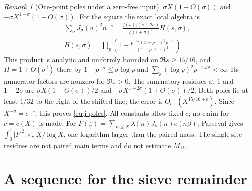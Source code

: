 \documentclass[11pt]{article}
\theoremstyle{definition}
\theoremstyle{remark}
\newtheorem{remark}[theorem]{Remark}
\numberwithin{equation}{section}
\begin{document}
\begin{remark}[One-point poles under a zero-free input]
$\sigma X(1+O(\sigma))$ and $-\sigma X^{1-\sigma}(1+O(\sigma))$.
For the square the exact local algebra is
\begin{equation}\label{eq:j-square-series}
\begin{gathered}
 \sum_nJ_\sigma(n)^2n^{-s}=\frac{\zeta(s)\zeta(s+2\sigma)}{\zeta(s+\sigma)^2}H(s,\sigma),\\
 H(s,\sigma)=\prod_p\left(1-
 \frac{p^{-2\sigma}(1-p^{-\sigma})^2p^{-2s}}{(1-p^{-s-\sigma})^2}\right).
\end{gathered}
\end{equation}
This product is analytic and uniformly bounded on $\Re s\ge15/16$, and $H=1+O(\sigma^2)$ there by
$1-p^{-\sigma}\le\sigma\log p$ and $\sum_p(\log p)^2p^{-15/8}<\infty$.
Its numerator factors are nonzero for $\Re s>0$. The summatory residues at $1$ and $1-2\sigma$ are
$\sigma X(1+O(\sigma))/2$ and $-\sigma X^{1-2\sigma}(1+O(\sigma))/2$.
Both poles lie at least $1/32$ to the right of the shifted line; the error is
$O_{c,\epsilon}(X^{15/16+\epsilon})$. Since $X^{-\sigma}=e^{-c}$, this proves \eqref{eq:j-poles}.
All constants allow fixed $c$; no claim for $c=c(X)$ is made.
For $F(\beta)=\sum_{n\le X}\lambda(n)J_\sigma(n)e(n\beta)$, Parseval gives
$\int_0^1|F|^2\asymp_cX/\log X$, one logarithm larger than the paired mass.
The single-site residues are not paired main terms and do not estimate $M_{12}$.
\end{remark}

\section{A sequence for the sieve remainder}\label{sec:sieve}
\end{document}
